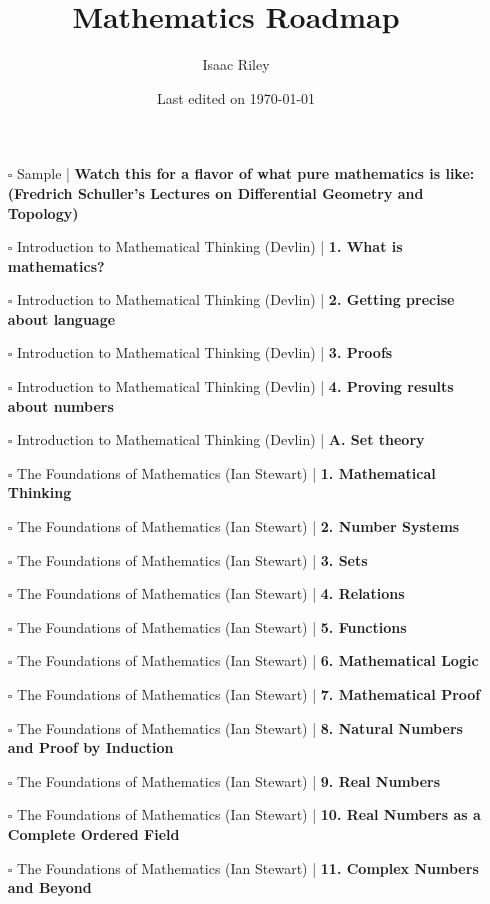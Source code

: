 \documentclass[a4, landscape, 12pt]{article}
\title{Mathematics Roadmap}
\author{Isaac Riley}
\date{Last edited on \today}
\newcommand{\checkbox}{$\square$}%
\newcommand{\checked}{\rlap{\raisebox{0.3ex}{\hspace{0.4ex}\tiny \ding{52}}}$\square$}
\begin{document}
\maketitle
\begin{itemize}
\item [\checked] Sample  | \textbf{Watch this for a flavor of what pure mathematics is like: (Fredrich Schuller’s Lectures on Differential Geometry and Topology)
}
\item [\checked] Introduction to Mathematical Thinking (Devlin)  | \textbf{1. What is mathematics?
}
\item [\checked]  Introduction to Mathematical Thinking (Devlin)  | \textbf{2. Getting precise about language
}
\item [\checked]  Introduction to Mathematical Thinking (Devlin)  | \textbf{3. Proofs
}
\item [\checked]  Introduction to Mathematical Thinking (Devlin)  | \textbf{4. Proving results about numbers
}
\item [\checked] Introduction to Mathematical Thinking (Devlin)  | \textbf{A. Set theory
}
\item [\checkbox] The Foundations of Mathematics (Ian Stewart)  | \textbf{1. Mathematical Thinking
}
\item [\checkbox] The Foundations of Mathematics (Ian Stewart)  | \textbf{2. Number Systems
}
\item [\checkbox] The Foundations of Mathematics (Ian Stewart)  | \textbf{3. Sets
}
\item [\checkbox] The Foundations of Mathematics (Ian Stewart)  | \textbf{4. Relations
}
\item [\checkbox] The Foundations of Mathematics (Ian Stewart)  | \textbf{5. Functions
}
\item [\checkbox] The Foundations of Mathematics (Ian Stewart)  | \textbf{6. Mathematical Logic
}
\item [\checkbox] The Foundations of Mathematics (Ian Stewart)  | \textbf{7. Mathematical Proof
}
\item [\checkbox] The Foundations of Mathematics (Ian Stewart)  | \textbf{8. Natural Numbers and Proof by Induction
}
\item [\checkbox] The Foundations of Mathematics (Ian Stewart)  | \textbf{9. Real Numbers
}
\item [\checkbox] The Foundations of Mathematics (Ian Stewart)  | \textbf{10. Real Numbers as a Complete Ordered Field
}
\item [\checkbox] The Foundations of Mathematics (Ian Stewart)  | \textbf{11. Complex Numbers and Beyond
}
\end{itemize}
\end{document}
